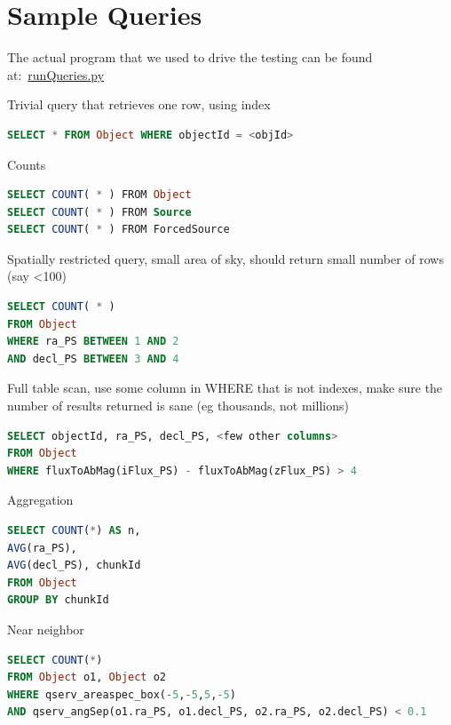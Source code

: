 \documentclass[DM,toc]{lsstdoc}
\begin{document}
\section{Sample Queries}\label{sample-queries}

The actual program that we used to drive the testing can be found
at:~\href{https://github.com/lsst-dm/db_tests_summer15/blob/tickets/DM-3364/DM-3364/runQueries.py}{runQueries.py}

Trivial query that retrieves one row, using index

\begin{lstlisting}[language=SQL]
SELECT * FROM Object WHERE objectId = <objId>
\end{lstlisting}

Counts

\begin{lstlisting}[language=SQL]
SELECT COUNT( * ) FROM Object
SELECT COUNT( * ) FROM Source
SELECT COUNT( * ) FROM ForcedSource
\end{lstlisting}

Spatially restricted query, small area of sky, should return small
number of rows (say \textless{}100)

\begin{lstlisting}[language=SQL]
SELECT COUNT( * )
FROM Object
WHERE ra_PS BETWEEN 1 AND 2
AND decl_PS BETWEEN 3 AND 4
\end{lstlisting}

Full table scan, use some column in WHERE that is not indexes, make sure
the number of results returned is sane (eg thousands, not millions)

\begin{lstlisting}[language=SQL]
SELECT objectId, ra_PS, decl_PS, <few other columns>
FROM Object
WHERE fluxToAbMag(iFlux_PS) - fluxToAbMag(zFlux_PS) > 4
\end{lstlisting}

Aggregation

\begin{lstlisting}[language=SQL]
SELECT COUNT(*) AS n,
AVG(ra_PS),
AVG(decl_PS), chunkId
FROM Object
GROUP BY chunkId
\end{lstlisting}

Near neighbor

\begin{lstlisting}[language=SQL]
SELECT COUNT(*)
FROM Object o1, Object o2
WHERE qserv_areaspec_box(-5,-5,5,-5)
AND qserv_angSep(o1.ra_PS, o1.decl_PS, o2.ra_PS, o2.decl_PS) < 0.1
\end{lstlisting}
\end{document}
